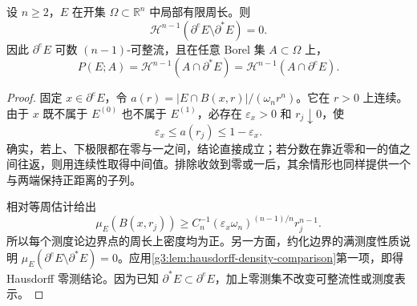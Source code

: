 \begin{corollary}\label{g3:cor:essential-reduced-boundary-equivalence}
	设 \(n\ge2\)，\(E\) 在开集 \(\Omega\subset\mathbb R^n\) 中局部有限周长。则
	\[
		\mathcal H^{n-1}(\partial^eE\setminus\partial^*E)=0.
	\]
	因此 \(\partial^eE\) 可数 \((n-1)\)-可整流，且在任意 Borel 集 \(A\subset\Omega\) 上，
	\[
		P(E;A)=\mathcal H^{n-1}(A\cap\partial^*E)
		=\mathcal H^{n-1}(A\cap\partial^eE).
	\]
\end{corollary}
\begin{proof}
	固定 \(x\in\partial^eE\)，令
	\(a(r)=|E\cap B(x,r)|/(\omega_nr^n)\)。它在 \(r>0\) 上连续。由于 \(x\) 既不属于 \(E^{(0)}\) 也不属于 \(E^{(1)}\)，必存在 \(\varepsilon_x>0\) 和 \(r_j\downarrow0\)，使
	\[
		\varepsilon_x\le a(r_j)\le1-\varepsilon_x.
	\]
	确实，若上、下极限都在零与一之间，结论直接成立；若分数在靠近零和一的值之间往返，则用连续性取得中间值。排除收敛到零或一后，其余情形也同样提供一个与两端保持正距离的子列。

	相对等周估计给出
	\[
		\mu_E(B(x,r_j))
		\ge C_n^{-1}(\varepsilon_x\omega_n)^{(n-1)/n}r_j^{n-1}.
	\]
	所以每个测度论边界点的周长上密度均为正。另一方面，约化边界的满测度性质说明
	\(\mu_E(\partial^eE\setminus\partial^*E)=0\)。应用\cref{g3:lem:hausdorff-density-comparison}第一项，即得 Hausdorff 零测结论。因为已知 \(\partial^*E\subset\partial^eE\)，加上零测集不改变可整流性或测度表示。
\end{proof}

